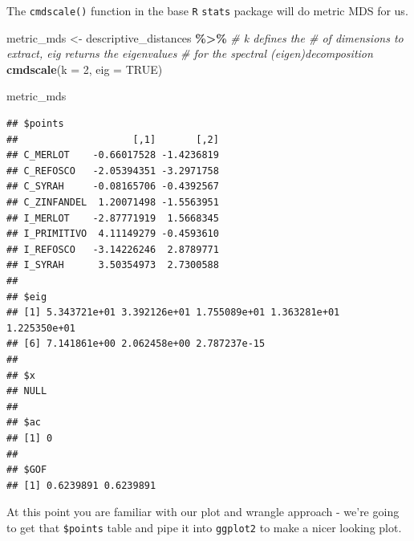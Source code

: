 \documentclass[
]{book}
\newenvironment{Shaded}{\begin{snugshade}}{\end{snugshade}}
\newcommand{\AttributeTok}[1]{\textcolor[rgb]{0.13,0.29,0.53}{#1}}
\newcommand{\CommentTok}[1]{\textcolor[rgb]{0.56,0.35,0.01}{\textit{#1}}}
\newcommand{\ConstantTok}[1]{\textcolor[rgb]{0.56,0.35,0.01}{#1}}
\newcommand{\DecValTok}[1]{\textcolor[rgb]{0.00,0.00,0.81}{#1}}
\newcommand{\FunctionTok}[1]{\textcolor[rgb]{0.13,0.29,0.53}{\textbf{#1}}}
\newcommand{\NormalTok}[1]{#1}
\newcommand{\OtherTok}[1]{\textcolor[rgb]{0.56,0.35,0.01}{#1}}
\newcommand{\SpecialCharTok}[1]{\textcolor[rgb]{0.81,0.36,0.00}{\textbf{#1}}}
\newcommand{\StringTok}[1]{\textcolor[rgb]{0.31,0.60,0.02}{#1}}
\begin{document}
The \texttt{cmdscale()} function in the base \texttt{R} \texttt{stats} package will do metric MDS for us.

\begin{Shaded}
\begin{Highlighting}[]
\NormalTok{metric\_mds }\OtherTok{\textless{}{-}} 
\NormalTok{  descriptive\_distances }\SpecialCharTok{\%\textgreater{}\%}
  \CommentTok{\# \textasciigrave{}k\textasciigrave{} defines the \# of dimensions to extract, \textasciigrave{}eig\textasciigrave{} returns the eigenvalues}
  \CommentTok{\# for the spectral (eigen)decomposition}
  \FunctionTok{cmdscale}\NormalTok{(}\AttributeTok{k =} \DecValTok{2}\NormalTok{, }\AttributeTok{eig =} \ConstantTok{TRUE}\NormalTok{)}

\NormalTok{metric\_mds}
\end{Highlighting}
\end{Shaded}

\begin{verbatim}
## $points
##                    [,1]       [,2]
## C_MERLOT    -0.66017528 -1.4236819
## C_REFOSCO   -2.05394351 -3.2971758
## C_SYRAH     -0.08165706 -0.4392567
## C_ZINFANDEL  1.20071498 -1.5563951
## I_MERLOT    -2.87771919  1.5668345
## I_PRIMITIVO  4.11149279 -0.4593610
## I_REFOSCO   -3.14226246  2.8789771
## I_SYRAH      3.50354973  2.7300588
## 
## $eig
## [1] 5.343721e+01 3.392126e+01 1.755089e+01 1.363281e+01 1.225350e+01
## [6] 7.141861e+00 2.062458e+00 2.787237e-15
## 
## $x
## NULL
## 
## $ac
## [1] 0
## 
## $GOF
## [1] 0.6239891 0.6239891
\end{verbatim}

At this point you are familiar with our plot and wrangle approach - we're going to get that \texttt{\$points} table and pipe it into \texttt{ggplot2} to make a nicer looking plot.

\begin{Shaded}
\end{Shaded}
\end{document}
